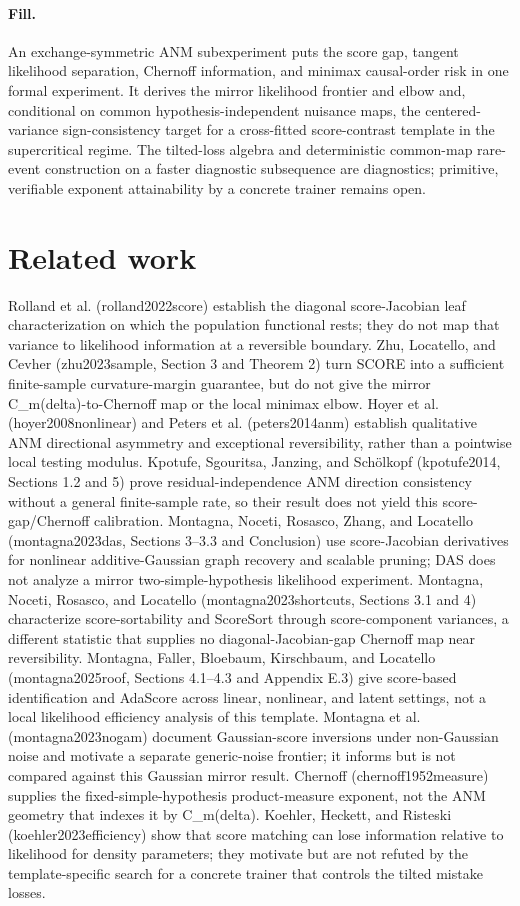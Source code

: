\documentclass{article}
\begin{document}
\paragraph{Fill.} An exchange-symmetric ANM subexperiment puts the score gap, tangent likelihood separation, Chernoff information, and minimax causal-order risk in one formal experiment. It derives the mirror likelihood frontier and elbow and, conditional on common hypothesis-independent nuisance maps, the centered-variance sign-consistency target for a cross-fitted score-contrast template in the supercritical regime. The tilted-loss algebra and deterministic common-map rare-event construction on a faster diagnostic subsequence are diagnostics; primitive, verifiable exponent attainability by a concrete trainer remains open.

\section{Related work}

Rolland et al. (rolland2022score) establish the diagonal score-Jacobian leaf characterization on which the population functional rests; they do not map that variance to likelihood information at a reversible boundary. Zhu, Locatello, and Cevher (zhu2023sample, Section 3 and Theorem 2) turn SCORE into a sufficient finite-sample curvature-margin guarantee, but do not give the mirror C_m(delta)-to-Chernoff map or the local minimax elbow. Hoyer et al. (hoyer2008nonlinear) and Peters et al. (peters2014anm) establish qualitative ANM directional asymmetry and exceptional reversibility, rather than a pointwise local testing modulus. Kpotufe, Sgouritsa, Janzing, and Schölkopf (kpotufe2014, Sections 1.2 and 5) prove residual-independence ANM direction consistency without a general finite-sample rate, so their result does not yield this score-gap/Chernoff calibration. Montagna, Noceti, Rosasco, Zhang, and Locatello (montagna2023das, Sections 3--3.3 and Conclusion) use score-Jacobian derivatives for nonlinear additive-Gaussian graph recovery and scalable pruning; DAS does not analyze a mirror two-simple-hypothesis likelihood experiment. Montagna, Noceti, Rosasco, and Locatello (montagna2023shortcuts, Sections 3.1 and 4) characterize score-sortability and ScoreSort through score-component variances, a different statistic that supplies no diagonal-Jacobian-gap Chernoff map near reversibility. Montagna, Faller, Bloebaum, Kirschbaum, and Locatello (montagna2025roof, Sections 4.1--4.3 and Appendix E.3) give score-based identification and AdaScore across linear, nonlinear, and latent settings, not a local likelihood efficiency analysis of this template. Montagna et al. (montagna2023nogam) document Gaussian-score inversions under non-Gaussian noise and motivate a separate generic-noise frontier; it informs but is not compared against this Gaussian mirror result. Chernoff (chernoff1952measure) supplies the fixed-simple-hypothesis product-measure exponent, not the ANM geometry that indexes it by C_m(delta). Koehler, Heckett, and Risteski (koehler2023efficiency) show that score matching can lose information relative to likelihood for density parameters; they motivate but are not refuted by the template-specific search for a concrete trainer that controls the tilted mistake losses.
\end{document}
